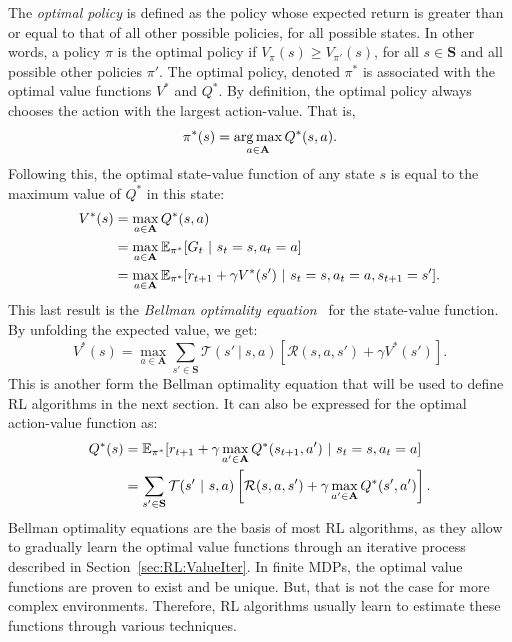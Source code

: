 The \textit{optimal policy} is defined as the policy whose expected return is greater than or equal to that of all other possible policies, for all possible states. In other words, a policy $\pi$ is the optimal policy if $V_\pi(s)\geq V_{\pi'}(s)$, for all $s\in\mathbf{S}$ and all possible other policies $\pi'$. The optimal policy, denoted $\pi^*$ is associated with the optimal value functions $V^*$ and $Q^*$. By definition, the optimal policy always chooses the action with the largest action-value. That is,
\begin{equation}
    \pi^*(s)=\operatorname*{arg\,max}_{a\in\mathbf{A}}Q^*(s,a).
\end{equation}
Following this, the optimal state-value function of any state $s$ is equal to the maximum value of $Q^*$ in this state:
\begin{align}
    V^*(s)&=\max_{a\in\mathbf{A}}Q^*(s,a)\notag\\
          &=\max_{a\in\mathbf{A}}\mathbb{E}_{\pi^*}[G_t\ |\ s_t=s,a_t=a]\notag\\
          &=\max_{a\in\mathbf{A}}\mathbb{E}_{\pi^*}[r_{t+1}+\gamma V^*(s')\ |\ s_t=s,a_t=a,s_{t+1}=s'].\label{eq:Bellman-v-exp}
\end{align}
This last result is the \textit{Bellman optimality equation}~\citep{Bellman1957_MDP} for the state-value function. By unfolding the expected value, we get:
\begin{equation}
    V^*(s)=\max_{a\in\mathbf{A}}\sum_{s'\in\mathbf{S}}\mathcal{T}(s'\ |\ s,a)\left[\mathcal{R}(s,a,s')+\gamma V^*(s')\right]. 
    \label{eq:Bellman-v}
\end{equation}
This is another form the Bellman optimality equation that will be used to define RL algorithms in the next section. It can also be expressed for the optimal action-value function as:
\begin{align}
    Q^*(s)&=\mathbb{E}_{\pi^*}[r_{t+1}+\gamma\max_{a'\in\mathbf{A}}Q^*(s_{t+1},a')\ |\ s_t=s,a_t=a]\notag\\
          &=\sum_{s'\in\mathbf{S}}\mathcal{T}(s'\ |\ s,a)\left[\mathcal{R}(s,a,s')+\gamma\max_{a'\in\mathbf{A}}Q^*(s',a')\right]. \label{eq:Bellman-q}
\end{align}
Bellman optimality equations are the basis of most RL algorithms, as they allow to gradually learn the optimal value functions through an iterative process described in Section~\ref{sec:RL:ValueIter}. In finite MDPs, the optimal value functions are proven to exist and be unique. But, that is not the case for more complex environments. Therefore, RL algorithms usually learn to estimate these functions through various techniques. 

